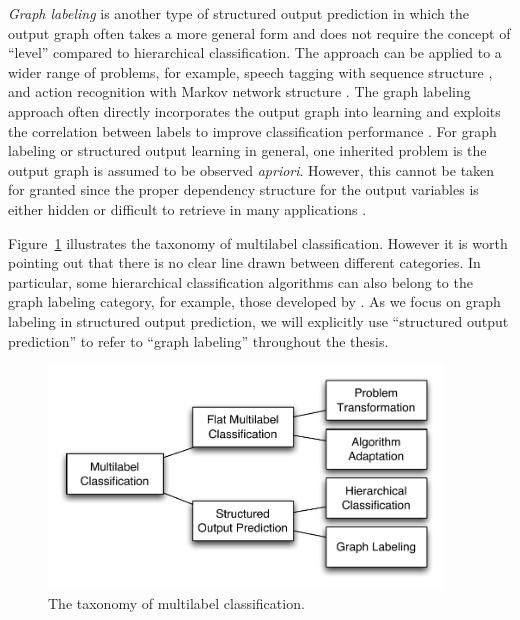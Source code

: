 \textit{Graph labeling} is another type of structured output prediction in which the output graph often takes a more general form and does not require the concept of ``level'' compared to hierarchical classification.
The approach can be applied to a wider range of problems, for example, speech tagging with sequence structure \citep{collins02a}, and action recognition with Markov network structure \citep{Wang11hidden}. 
The graph labeling approach often directly incorporates the output graph into learning and exploits the correlation between labels to improve classification performance \citep{collins02a,lafferty01,taskar02,Taskar04max,THJA04,Rousu07}.
For graph labeling or structured output learning in general, one inherited problem is the output graph is assumed to be observed \textit{apriori}.
However, this cannot be taken for granted since the proper dependency structure for the output variables is either hidden or difficult to retrieve in many applications \citep{Chickering94learning}.

Figure~\ref{multilabel_taxonomy} illustrates the taxonomy of multilabel classification.
However it is worth pointing out that there is no clear line drawn between different categories.
In particular, some hierarchical classification algorithms can also belong to the graph labeling category, for example, those developed by \citet{THJA04,Rousu06}.
As we focus on graph labeling in structured output prediction, we will explicitly use ``structured output prediction'' to refer to ``graph labeling'' throughout the thesis.

\begin{figure}
\begin{center}
	\centering
	\includegraphics[width=10.5cm]{./taxonomy.pdf}
	\caption{The taxonomy of multilabel classification.}
	\label{multilabel_taxonomy}
\end{center}
\end{figure}

